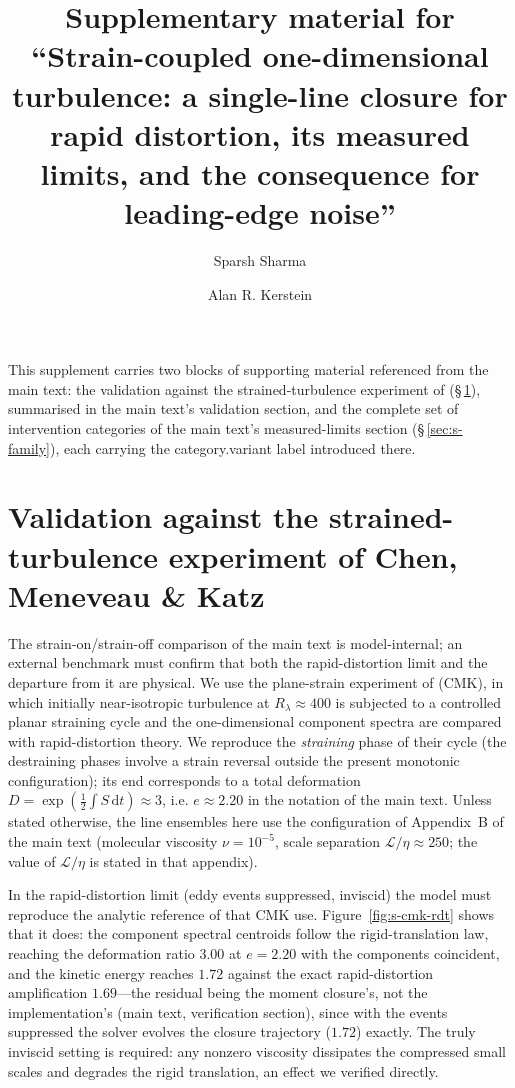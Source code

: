 \documentclass{JFM-FLM_Au}
\title{Supplementary material for ``Strain-coupled one-dimensional
turbulence: a single-line closure for rapid distortion, its measured
limits, and the consequence for leading-edge noise''}
\author{Sparsh Sharma\aff{1} \and Alan R. Kerstein\aff{2}}
\affiliation{\aff{1}German Aerospace Center (DLR), 38108 Braunschweig, Germany
\aff{2}Consultant, Danville, CA 94526, USA}
\begin{document}
\maketitle

This supplement carries two blocks of supporting material referenced
from the main text: the validation against the strained-turbulence
experiment of \citet{ChenMeneveauKatz2006} (\S\,\ref{sec:s-cmk}),
summarised in the main text's validation section, and the complete set of intervention categories of the main text's measured-limits section (\S\,\ref{sec:s-family}), each carrying the category.variant label introduced there.

\section{Validation against the strained-turbulence experiment of
Chen, Meneveau \& Katz}\label{sec:s-cmk}

The strain-on/strain-off comparison of the main text is model-internal;
an external benchmark must confirm that both the rapid-distortion limit
and the departure from it are physical. We use the plane-strain
experiment of \citet{ChenMeneveauKatz2006} (CMK), in which initially
near-isotropic turbulence at $R_\lambda\approx400$ is subjected to a
controlled planar straining cycle and the one-dimensional component
spectra are compared with rapid-distortion theory. We reproduce the
\emph{straining} phase of their cycle (the destraining phases involve a
strain reversal outside the present monotonic configuration); its end
corresponds to a total deformation
$D=\exp(\tfrac12\!\int S\,\mathrm{d}t)\approx3$, i.e. $e\approx2.20$ in
the notation of the main text. Unless stated otherwise, the line
ensembles here use the configuration of Appendix~B of the main text
(molecular viscosity $\nu=10^{-5}$, scale separation
$\mathcal L/\eta\approx250$; the value of $\mathcal L/\eta$ is stated
in that appendix).

In the rapid-distortion limit (eddy events suppressed, inviscid) the
model must reproduce the analytic reference of
\citet{LeePiomelliReynolds1986} that CMK use.
Figure~\ref{fig:s-cmk-rdt} shows that it does: the component spectral
centroids follow the rigid-translation law, reaching the deformation
ratio $3.00$ at $e=2.20$ with the components coincident, and the
kinetic energy reaches $1.72$ against the exact rapid-distortion
amplification $1.69$---the residual being the moment closure's, not the
implementation's (main text, verification section), since with the
events suppressed the solver evolves the closure trajectory ($1.72$)
exactly. The truly inviscid setting is required: any nonzero viscosity
dissipates the compressed small scales and degrades the rigid
translation, an effect we verified directly.
\end{document}
